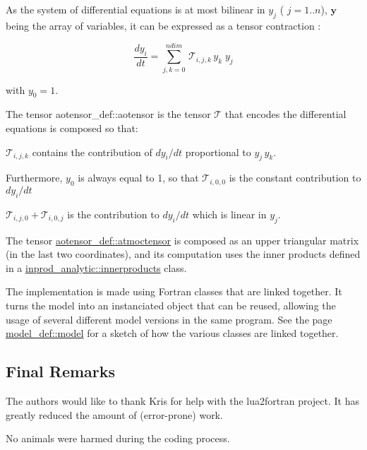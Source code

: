 As the system of differential equations is at most bilinear in $y_j$ ( $j=1..n$), $\boldsymbol{y}$ being the array of variables, it can be expressed as a tensor contraction \+:

\[ \frac{d y_i}{dt} = \sum_{j,k=0}^{ndim} \, \mathcal{T}_{i,j,k} \, y_k \; y_j \]

with $y_0 = 1$.

The tensor aotensor\+\_\+def\+::aotensor is the tensor $\mathcal{T}$ that encodes the differential equations is composed so that\+:


\begin{DoxyItemize}
\item $\mathcal{T}_{i,j,k}$ contains the contribution of $dy_i/dt$ proportional to $ y_j \, y_k$.
\item Furthermore, $y_0$ is always equal to 1, so that $\mathcal{T}_{i,0,0}$ is the constant contribution to $dy_i/dt$
\item $\mathcal{T}_{i,j,0} + \mathcal{T}_{i,0,j}$ is the contribution to $dy_i/dt$ which is linear in $y_j$.
\end{DoxyItemize}

The tensor \hyperlink{structaotensor__def_1_1atmoctensor}{aotensor\+\_\+def\+::atmoctensor} is composed as an upper triangular matrix (in the last two coordinates), and its computation uses the inner products defined in a \hyperlink{structinprod__analytic_1_1innerproducts}{inprod\+\_\+analytic\+::innerproducts} class.

The implementation is made using Fortran classes that are linked together. It turns the model into an instanciated object that can be reused, allowing the usage of several different model versions in the same program. See the page \hyperlink{structmodel__def_1_1model}{model\+\_\+def\+::model} for a sketch of how the various classes are linked together.





\subsection*{Final Remarks}

The authors would like to thank Kris for help with the lua2fortran project. It has greatly reduced the amount of (error-\/prone) work.

No animals were harmed during the coding process. 